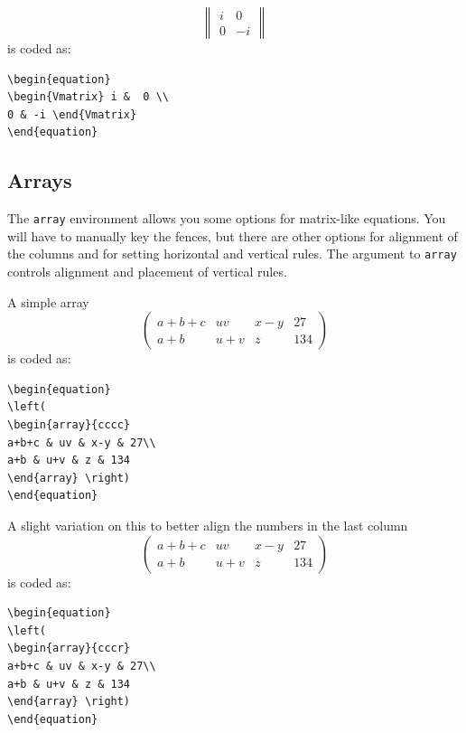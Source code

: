 \documentclass[lettersize,journal]{IEEEtran}
\begin{document}
\begin{equation}
  \begin{Vmatrix} i & 0  \\
                0 & -i\end{Vmatrix}
\end{equation}
is coded as:
\begin{verbatim}
\begin{equation}
\begin{Vmatrix} i &  0 \\ 
0 & -i \end{Vmatrix}
\end{equation}\end{verbatim}

\subsection{Arrays}
The {\tt{array}} environment allows you some options for matrix-like equations.
You will have to manually key the fences, but there are other options for
alignment of the columns and for setting horizontal and vertical rules. The
argument to {\tt{array}} controls alignment and placement of vertical rules.

A simple array
\begin{equation}
  \left(
  \begin{array}{cccc}
    a+b+c & uv  & x-y & 27  \\
    a+b   & u+v & z   & 134
  \end{array}\right)
\end{equation}
is coded as:
\begin{verbatim}
\begin{equation}
\left(
\begin{array}{cccc}
a+b+c & uv & x-y & 27\\
a+b & u+v & z & 134
\end{array} \right)
\end{equation}
\end{verbatim}

A slight variation on this to better align the numbers in the last column
\begin{equation}
  \left(
  \begin{array}{cccr}
    a+b+c & uv  & x-y & 27  \\
    a+b   & u+v & z   & 134
  \end{array}\right)
\end{equation}
is coded as:
\begin{verbatim}
\begin{equation}
\left(
\begin{array}{cccr}
a+b+c & uv & x-y & 27\\
a+b & u+v & z & 134
\end{array} \right)
\end{equation}
\end{verbatim}
\end{document}
